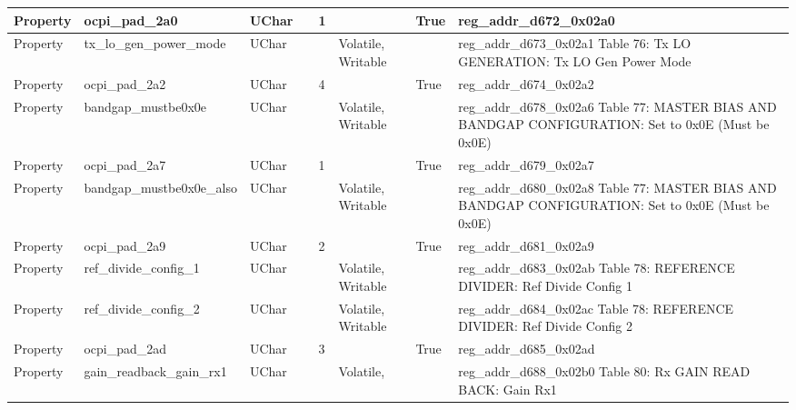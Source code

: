 \documentclass{article}
\begin{document}
\begin{scriptsize}
\begin{longtable}{|p{2cm}|p{5cm}|p{1cm}|p{2cm}|p{2cm}|p{1.75cm}|p{1.5cm}|p{5.1cm}|}
  \hline
  Property & ocpi\_pad\_2a0                                           & UChar &                  & 1                &                     & True    & reg\_addr\_d672\_0x02a0 \\
  \hline
  Property & tx\_lo\_gen\_power\_mode                                 & UChar &                  &                  & Volatile,  Writable &         & reg\_addr\_d673\_0x02a1 Table 76: Tx LO GENERATION: Tx LO Gen Power Mode \\
  \hline
  Property & ocpi\_pad\_2a2                                           & UChar &                  & 4                &                     & True    & reg\_addr\_d674\_0x02a2 \\
  \hline
  Property & bandgap\_mustbe0x0e                                      & UChar &                  &                  & Volatile,  Writable &         & reg\_addr\_d678\_0x02a6 Table 77: MASTER BIAS AND BANDGAP CONFIGURATION: Set to 0x0E (Must be 0x0E) \\
  \hline
  Property & ocpi\_pad\_2a7                                           & UChar &                  & 1                &                     & True    & reg\_addr\_d679\_0x02a7 \\
  \hline
  Property & bandgap\_mustbe0x0e\_also                                & UChar &                  &                  & Volatile,  Writable &         & reg\_addr\_d680\_0x02a8 Table 77: MASTER BIAS AND BANDGAP CONFIGURATION: Set to 0x0E (Must be 0x0E) \\
  \hline
  Property & ocpi\_pad\_2a9                                           & UChar &                  & 2                &                     & True    & reg\_addr\_d681\_0x02a9 \\
  \hline
  Property & ref\_divide\_config\_1                                   & UChar &                  &                  & Volatile,  Writable &         & reg\_addr\_d683\_0x02ab Table 78: REFERENCE DIVIDER: Ref Divide Config 1 \\
  \hline
  Property & ref\_divide\_config\_2                                   & UChar &                  &                  & Volatile,  Writable &         & reg\_addr\_d684\_0x02ac Table 78: REFERENCE DIVIDER: Ref Divide Config 2 \\
  \hline
  Property & ocpi\_pad\_2ad                                           & UChar &                  & 3                &                     & True    & reg\_addr\_d685\_0x02ad \\
  \hline
  Property & gain\_readback\_gain\_rx1                                & UChar &                  &                  & Volatile,           &         & reg\_addr\_d688\_0x02b0 Table 80: Rx GAIN READ BACK: Gain Rx1 \\

\end{longtable}
\end{scriptsize}
\end{document}
